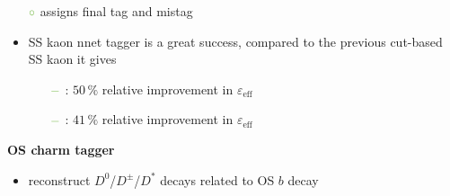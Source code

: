 {\begin{minipage}{0.474\boxwidth}
\begin{itemize}
\begin{itemize}
\begin{itemize}
\item[${\color{tu_gruen}\circ}$] assigns final tag and mistag
\end{itemize}
\end{itemize}
\end{itemize}
\begin{itemize}
\setlength\itemsep{0.01em}
\item SS kaon nnet tagger is a great success, compared \newline to the previous cut-based SS kaon it gives  
\begin{itemize}
\setlength{\itemindent}{-.11in}
\vspace{-0.5em}
\item[${\color{tu_gruen}-}$] \BsToDspi: $50\,\%$ relative improvement in $\varepsilon_{\text{eff}}$
\item[${\color{tu_gruen}-}$] \BsToJPsiPhi: $41\,\%$ relative improvement in $\varepsilon_{\text{eff}}$
\end{itemize}
\end{itemize}
\vspace{0.2em}
\textbf{OS charm tagger}
\vspace{-0.1em}
\begin{itemize}
\setlength\itemsep{0.01em}
\item reconstruct $D^0$/$D^\pm$/$D^*$ decays related to OS $b$ decay

\end{itemize}
\end{minipage}}
